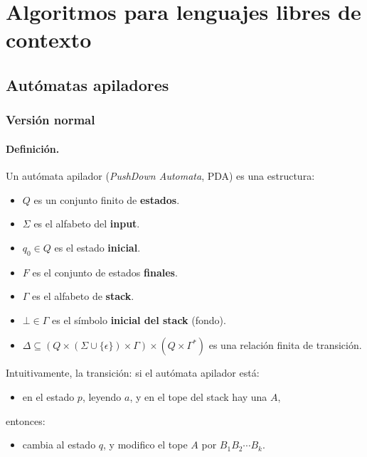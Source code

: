 \section{Algoritmos para lenguajes libres de contexto}
\subsection{Autómatas apiladores}
\subsubsection{Versión normal}


\paragraph*{Definición.} Un autómata apilador (\textit{PushDown Automata}, PDA) es una estructura:
\begin{itemize}
    \item $Q$ es un conjunto finito de \textbf{estados}.
    \item $\Sigma$ es el alfabeto del \textbf{input}.
    \item $q_0 \in Q$ es el estado \textbf{inicial}.
    \item $F$ es el conjunto de estados \textbf{finales}.
    \item $\Gamma$ es el alfabeto de \textbf{stack}.
    \item $\bot \in \Gamma$ es el símbolo \textbf{inicial del stack} (fondo).
    \item $\Delta \subseteq(Q \times(\Sigma \cup\{\epsilon\}) \times \Gamma) \times\left(Q \times \Gamma^*\right)$ es una relación finita de transición.
\end{itemize}

Intuitivamente, la transición:
si el autómata apilador está:
\begin{itemize}
    \item en el estado $p$, leyendo $a$, y en el tope del stack hay una $A$,
\end{itemize}
entonces:
\begin{itemize}
    \item cambia al estado $q$, y modifico el tope $A$ por $B_1B_2\cdots B_k$.
\end{itemize}

